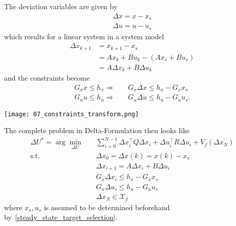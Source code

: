 \newpar{}

The deviation variables are given by
\begin{gather*}
    \Delta x = x - x_s \\
    \Delta u = u - u_s
\end{gather*}
which results for a linear system in a system model
\begin{align*}
    \Delta x_{k+1} & = x_{k+1}-x_s                \\
                   & = Ax_k + Bu_k -(Ax_s + Bu_s) \\
                   & = A\Delta x_k + B\Delta u_k
\end{align*}
and the constraints become
\begin{align*}
    G_x x \leq h_x \Rightarrow & \quad G_x\Delta x \leq h_x - G_x x_s  \\
    G_u u \leq h_u \Rightarrow & \quad G_u\Delta u \leq h_u - G_u u_s.
\end{align*}

\begin{center}
    \texttt{[image: 07\_constraints\_transform.png]}
\end{center}

\newpar{}

The complete problem in Delta-Formulation then looks like
\begin{align*}
    \Delta U^* = \arg\min_{\Delta U} \quad & \sum_{i=0}^{N-1} \Delta x_i^\top Q \Delta x_i + \Delta u_i^\top R \Delta u_i + V_f(\Delta x_N) \\
    \text{s.t.} \quad                      & \Delta x_0 = \Delta x(k) = x(k)-x_s                                                            \\
                                           & \Delta x_{i+1} = A \Delta x_i + B \Delta u_i                                                   \\
                                           & G_x \Delta x_i \leq h_x - G_x x_s                                                              \\
                                           & G_u \Delta u_i \leq h_u - G_u u_s                                                              \\
                                           & \Delta x_N \in \mathcal{X}_f
\end{align*}
where $x_s, u_s$ is assumed to be determined beforehand by~\ref{steady_state_target_selection}.

